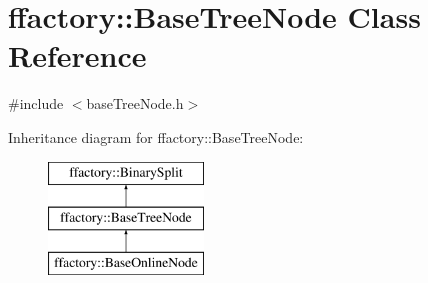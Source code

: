 \hypertarget{classffactory_1_1_base_tree_node}{\section{ffactory\-:\-:Base\-Tree\-Node Class Reference}
\label{classffactory_1_1_base_tree_node}
}


{\ttfamily \#include $<$base\-Tree\-Node.\-h$>$}

Inheritance diagram for ffactory\-:\-:Base\-Tree\-Node\-:\begin{figure}[H]
\begin{center}
\leavevmode
\includegraphics[height=3.000000cm]{classffactory_1_1_base_tree_node}
\end{center}
\end{figure}
